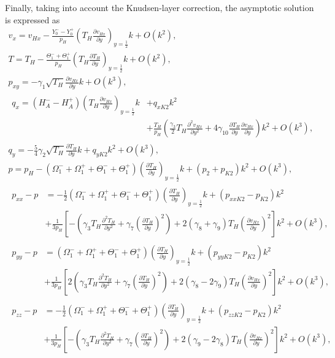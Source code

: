 \documentclass[]{elsarticle} %
\newcommand{\pder}[2][]{\frac{\partial#1}{\partial#2}}
\newcommand{\pderdual}[2][]{\frac{\partial^2#1}{\partial#2^2}}
\newcommand{\OO}[1]{O(#1)}
\begin{document}
Finally, taking into account the Knudsen-layer correction, the asymptotic solution is expressed as
\begin{gather}
    v_x = v_{Hx} - \frac{Y_0^--Y_0^+}{p_H}\left(T_H\pder[v_{Hx}]{y}\right)_{y=\frac12}k + \OO{k^2}, \label{eq:Hilbert_U}\\
    T = T_H - \frac{\Theta_1^-+\Theta_1^+}{p_H}\left(T_H\pder[T_H]{y}\right)_{y=\frac12}k + \OO{k^2}, \label{eq:Hilbert_T}\\
    p_{xy} = -\gamma_1\sqrt{T_H}\pder[v_{Hx}]{y}k + \OO{k^3}, \label{eq:Hilbert_Pxy}\\
    \begin{aligned}
        q_x = (H_A^--H_A^+)\left(T_H\pder[v_{Hx}]{y}\right)_{y=\frac12}k &+ q_{xK2}k^2 \\
        &+ \frac{T_H}{p_H}\left(\frac{\gamma_3}2 T_H \pderdual[v_{Hx}]{y}
        + 4\gamma_{10} \pder[T_H]{y}\pder[v_{Hx}]{y}\right)k^2 + \OO{k^3},
    \end{aligned}\label{eq:Hilbert_Qx}\\
    q_y = -\frac54\gamma_2\sqrt{T_H}\pder[T_H]{y}k + q_{yK2}k^2 + \OO{k^3}, \label{eq:Hilbert_Qy}\\
    p = p_H - (\Omega_1^-+\Omega_1^+ + \Theta_1^-+\Theta_1^+)\left(\pder[T_H]{y}\right)_{y=\frac12}k
        + (p_2 + p_{K2})k^2 + \OO{k^3}, \label{eq:Hilbert_p}\\
    \begin{aligned}
    p_{xx} - p &= -\frac12 (\Omega_1^-+\Omega_1^+ + \Theta_1^-+\Theta_1^+)\left(\pder[T_H]{y}\right)_{y=\frac12}k
        + (p_{xxK2}-p_{K2})k^2 \\
        &+ \frac1{3p_H}\left[-\left(\gamma_3 T_H \pderdual[T_H]{y} + \gamma_7\left(\pder[T_H]{y}\right)^2\right)
        + 2(\gamma_8+\gamma_9)T_H\left(\pder[v_{Hx}]{y}\right)^2\right]k^2 + \OO{k^3},
    \end{aligned}\label{eq:Hilbert_Pxx}\\
    \begin{aligned}
    p_{yy} - p &= (\Omega_1^-+\Omega_1^+ + \Theta_1^-+\Theta_1^+)\left(\pder[T_H]{y}\right)_{y=\frac12}k
        + (p_{yyK2}-p_{K2})k^2 \\
        &+ \frac1{3p_H}\left[2\left(\gamma_3 T_H \pderdual[T_H]{y} + \gamma_7\left(\pder[T_H]{y}\right)^2\right)
        + 2(\gamma_8-2\gamma_9)T_H\left(\pder[v_{Hx}]{y}\right)^2\right]k^2 + \OO{k^3},
    \end{aligned}\label{eq:Hilbert_Pyy}\\
    \begin{aligned}
    p_{zz} - p &= -\frac12 (\Omega_1^-+\Omega_1^+ + \Theta_1^-+\Theta_1^+)\left(\pder[T_H]{y}\right)_{y=\frac12}k
        + (p_{zzK2}-p_{K2})k^2 \\
        &+ \frac1{3p_H}\left[-\left(\gamma_3 T_H \pderdual[T_H]{y} + \gamma_7\left(\pder[T_H]{y}\right)^2\right)
        + 2(\gamma_9-2\gamma_8)T_H\left(\pder[v_{Hx}]{y}\right)^2\right]k^2 + \OO{k^3},
    \end{aligned}\label{eq:Hilbert_Pzz}
\end{gather}
\end{document}
